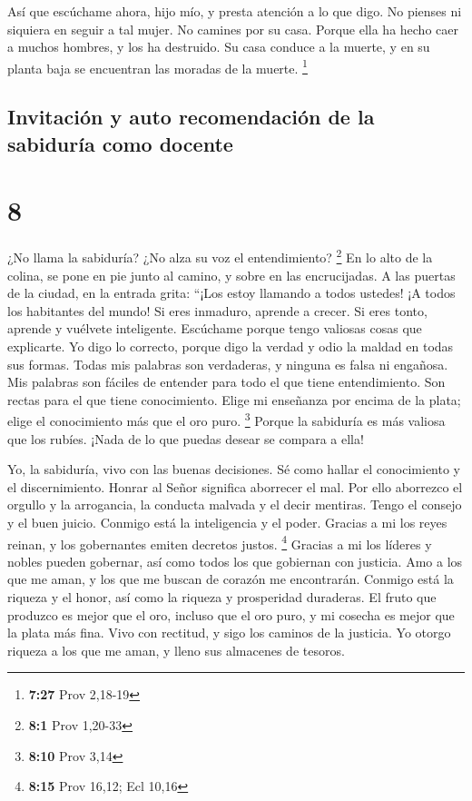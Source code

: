  Así que escúchame ahora, hijo mío, y presta atención a lo
que digo.  No pienses ni siquiera en seguir a tal mujer. No
camines por su casa.  Porque ella ha hecho caer a muchos
hombres, y los ha destruido.  Su casa conduce a la muerte,
y en su planta baja se encuentran las moradas de la muerte. \footnote{\textbf{7:27}
  Prov 2,18-19}

\hypertarget{invitaciuxf3n-y-auto-recomendaciuxf3n-de-la-sabiduruxeda-como-docente}{%
\subsection{Invitación y auto recomendación de la sabiduría como
docente}\label{invitaciuxf3n-y-auto-recomendaciuxf3n-de-la-sabiduruxeda-como-docente}}

\hypertarget{section-7}{%
\section{8}\label{section-7}}

 ¿No llama la sabiduría? ¿No alza su voz el entendimiento?
\footnote{\textbf{8:1} Prov 1,20-33}  En lo alto de la
colina, se pone en pie junto al camino, y sobre en las encrucijadas.
 A las puertas de la ciudad, en la entrada grita:
 ``¡Los estoy llamando a todos ustedes! ¡A todos los
habitantes del mundo!  Si eres inmaduro, aprende a crecer.
Si eres tonto, aprende y vuélvete inteligente.  Escúchame
porque tengo valiosas cosas que explicarte.  Yo digo lo
correcto, porque digo la verdad y odio la maldad en todas sus formas.
 Todas mis palabras son verdaderas, y ninguna es falsa ni
engañosa.  Mis palabras son fáciles de entender para todo el
que tiene entendimiento. Son rectas para el que tiene conocimiento.
 Elige mi enseñanza por encima de la plata; elige el
conocimiento más que el oro puro. \footnote{\textbf{8:10} Prov 3,14}
 Porque la sabiduría es más valiosa que los rubíes. ¡Nada
de lo que puedas desear se compara a ella!

 Yo, la sabiduría, vivo con las buenas decisiones. Sé como
hallar el conocimiento y el discernimiento.  Honrar al
Señor significa aborrecer el mal. Por ello aborrezco el orgullo y la
arrogancia, la conducta malvada y el decir mentiras.  Tengo
el consejo y el buen juicio. Conmigo está la inteligencia y el poder.
 Gracias a mi los reyes reinan, y los gobernantes emiten
decretos justos. \footnote{\textbf{8:15} Prov 16,12; Ecl 10,16}
 Gracias a mi los líderes y nobles pueden gobernar, así
como todos los que gobiernan con justicia.  Amo a los que
me aman, y los que me buscan de corazón me encontrarán. 
Conmigo está la riqueza y el honor, así como la riqueza y prosperidad
duraderas.  El fruto que produzco es mejor que el oro,
incluso que el oro puro, y mi cosecha es mejor que la plata más fina.
 Vivo con rectitud, y sigo los caminos de la justicia.
 Yo otorgo riqueza a los que me aman, y lleno sus almacenes
de tesoros.

